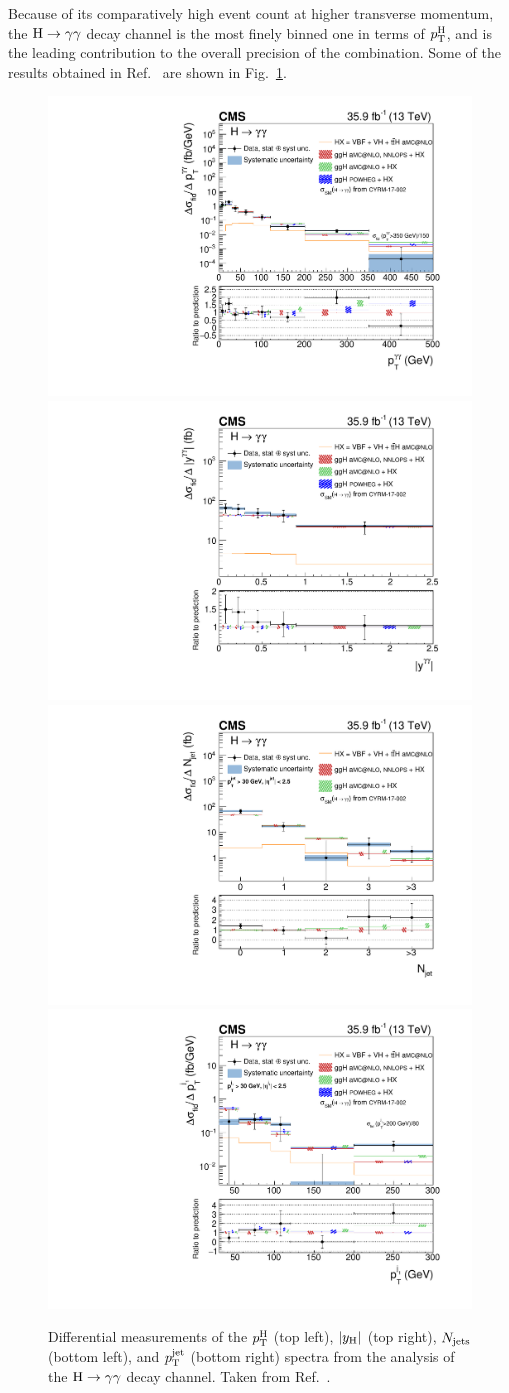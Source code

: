 Because of its comparatively high event count at higher transverse momentum, the $\mathrm{H}\to\mathrm{\gamma}\mathrm{\gamma}$ decay channel is the most finely binned one in terms of $p_\mathrm{T}^\mathrm{H}$, and is the leading contribution to the overall precision of the combination.
% 
Some of the results obtained in Ref.~\cite{Sirunyan:2018kta} are shown in Fig.~\ref{fig:hgg-results}.


\begin{figure}[hbtp]
  \begin{center}
    \includegraphics[width=0.49\linewidth]{img/inputs/hgg/pth.pdf}
    \includegraphics[width=0.49\linewidth]{img/inputs/hgg/absy.pdf}
    \\
    \includegraphics[width=0.49\linewidth]{img/inputs/hgg/njets.pdf}
    \includegraphics[width=0.49\linewidth]{img/inputs/hgg/ptjet.pdf}
    \caption{
        Differential measurements of the $p_\mathrm{T}^\mathrm{H}$ (top left), $\left|y_\mathrm{H}\right| $ (top right), $N_\text{jets} $ (bottom left), and $p_\mathrm{T}^\text{jet} $ (bottom right) spectra from the analysis of the $\mathrm{H}\to\mathrm{\gamma}\mathrm{\gamma}$ decay channel.
        Taken from Ref.~\cite{Sirunyan:2018kta}.
        }
    \label{fig:hgg-results}
  \end{center}
\end{figure}



